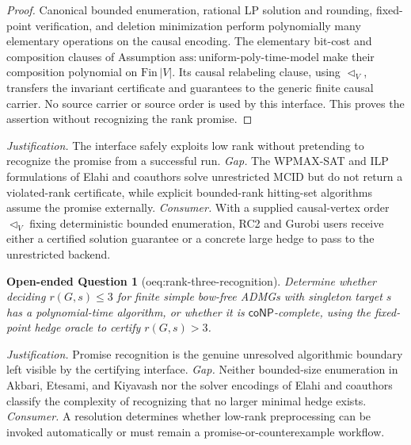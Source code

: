 \documentclass{article}
\newtheorem{openendedquestion}{Open-ended Question}
\begin{document}
\begin{proof}
Canonical bounded enumeration, rational LP solution and rounding,
fixed-point verification, and deletion minimization perform polynomially
many elementary operations on the causal encoding.  The elementary bit-cost
and composition clauses of Assumption
\(\mathrm{ass{:}uniform\mbox{-}poly\mbox{-}time\mbox{-}model}\) make their
composition polynomial on \(\mathrm{Fin}\,|V|\).  Its causal relabeling
clause, using \(\triangleleft_V\), transfers the invariant certificate and
guarantees to the generic finite causal carrier.  No source carrier or
source order is used by this interface.  This proves the assertion without
recognizing the rank promise.
\end{proof}
\par\smallskip\noindent \textit{Justification.} The interface safely exploits low rank without pretending to recognize the promise from a successful run. \textit{Gap.} The WPMAX-SAT and ILP formulations of Elahi and coauthors solve unrestricted MCID but do not return a violated-rank certificate, while explicit bounded-rank hitting-set algorithms assume the promise externally. \textit{Consumer.} With a supplied causal-vertex order \(\triangleleft_V\) fixing deterministic bounded enumeration, RC2 and Gurobi users receive either a certified solution guarantee or a concrete large hedge to pass to the unrestricted backend.

\begin{openendedquestion}[oeq:rank-three-recognition]\label{oeq:rank-three-recognition}
Determine whether deciding \(r(G,s)\leq3\) for finite simple bow-free ADMGs with singleton target \(s\) has a polynomial-time algorithm, or whether it is \(\mathsf{coNP}\)-complete, using the fixed-point hedge oracle to certify \(r(G,s)>3\).
\end{openendedquestion}
\par\smallskip\noindent \textit{Justification.} Promise recognition is the genuine unresolved algorithmic boundary left visible by the certifying interface. \textit{Gap.} Neither bounded-size enumeration in Akbari, Etesami, and Kiyavash nor the solver encodings of Elahi and coauthors classify the complexity of recognizing that no larger minimal hedge exists. \textit{Consumer.} A resolution determines whether low-rank preprocessing can be invoked automatically or must remain a promise-or-counterexample workflow.
\end{document}
